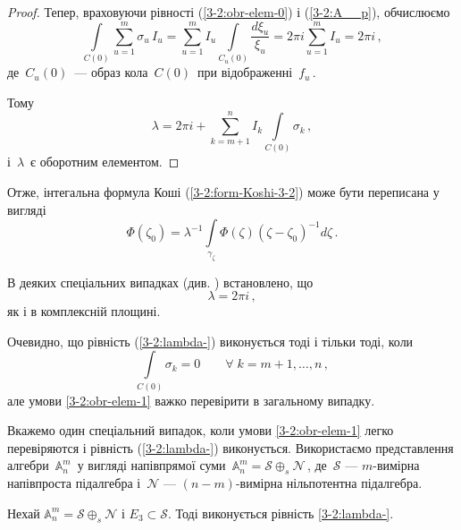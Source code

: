 \documentclass[11pt, reqno]{amsart}
\begin{document}
\begin{proof}
Тепер, враховуючи рівності (\ref{3-2:obr-elem-0}) і (\ref{3-2:A__p}), обчислюємо
$$\int\limits_{C(0)}\sum\limits_{u=1}^m\sigma_u\,I_u=
\sum\limits_{u=1}^mI_u\int\limits_{C_u(0)}\frac{d\xi_u}{\xi_u}=
2\pi i\sum\limits_{u=1}^mI_u=2\pi i\,,
$$
де\, $C_u(0)$\, --- образ кола\, $C(0)$\, при відображенні\, $f_u$\,.

Тому
\begin{equation*}
\lambda=2\pi
i+\sum\limits_{k=m+1}^nI_k\int\limits_{C(0)}\sigma_k\,,
\end{equation*}
і\, $\lambda$\, є оборотним елементом.
\end{proof}

\vskip 1mm

Отже, інтегальна формула Коші (\ref{3-2:form-Koshi-3-2}) може бути переписана у вигляді
\begin{equation}\label{3-2:form-Koshi-3-2-ober-lambda}
\Phi(\zeta_{0})=
\lambda^{-1}\int\limits_{\gamma_{\zeta}}\Phi(\zeta)\left(\zeta-\zeta_{0}\right)^{-1}d\zeta\,.
\end{equation}

В деяких спеціальних випадках (див. \cite{Pl-Shp3,Pl-Shp-Al,Pukh-5}) встановлено,
що
\begin{equation}\label{3-2:lambda-}
\lambda=2\pi i\,,
\end{equation}
як і в комплексній площині.

Очевидно, що рівність (\ref{3-2:lambda-}) виконується тоді і тільки тоді, коли
\begin{equation}\label{3-2:obr-elem-1}
\int\limits_{C(0)}\sigma_k=0\qquad \forall\;k=m+1,\ldots,n\,,
\end{equation}
але умови \eqref{3-2:obr-elem-1} важко перевірити в загальному випадку.


Вкажемо один спеціальний випадок, коли умови \eqref{3-2:obr-elem-1} легко перевіряются і
рівність (\ref{3-2:lambda-}) виконується.
Використаємо представлення алгебри\, $\mathbb{A}_n^m$\, у вигляді напівпрямої суми\,
$\mathbb{A}_n^m=\mathcal{S}\oplus_s \mathcal{N}$\,, де\, $\mathcal{S}$ --- $m$-вимірна напівпроста підалгебра
і\, $\mathcal{N}$ --- $(n-m)$-вимірна нільпотентна підалгебра.


\vskip 1mm

\begin{theorem}\label{3-2:teo-pro-napivprostu-alg-}
Нехай $\mathbb{A}_n^m=\mathcal{S}\oplus_s \mathcal{N}$ і $E_3\subset \mathcal{S}$.
Тоді виконується рівність \eqref{3-2:lambda-}.
 \end{theorem}
\end{document}
